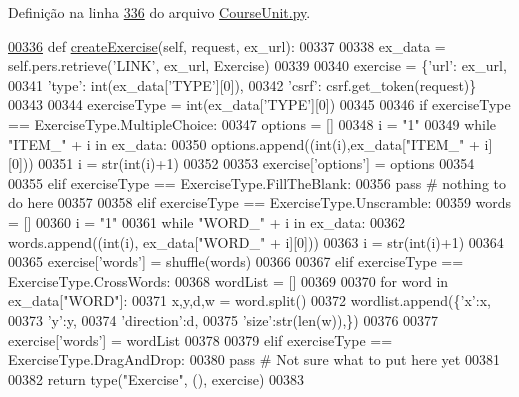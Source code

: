 Definição na linha \hyperlink{CourseUnit_8py_source_l00336}{336} do arquivo \hyperlink{CourseUnit_8py_source}{Course\+Unit.\+py}.


\begin{DoxyCode}
\hypertarget{classCourse_1_1CourseUnit_1_1BusCourse_l00336}{}\hyperlink{classCourse_1_1CourseUnit_1_1BusCourse_a4b9b8ec5eb949d3a1b42aee125b1b90b}{00336}     \textcolor{keyword}{def }\hyperlink{classCourse_1_1CourseUnit_1_1BusCourse_a4b9b8ec5eb949d3a1b42aee125b1b90b}{createExercise}(self, request, ex\_url):
00337 
00338         ex\_data = self.pers.retrieve(\textcolor{stringliteral}{'LINK'}, ex\_url, Exercise)
00339 
00340         exercise = \{\textcolor{stringliteral}{'url'}: ex\_url, 
00341                     \textcolor{stringliteral}{'type'}: int(ex\_data[\textcolor{stringliteral}{'TYPE'}][0]),
00342                     \textcolor{stringliteral}{'csrf'}: csrf.get\_token(request)\}
00343 
00344         exerciseType = int(ex\_data[\textcolor{stringliteral}{'TYPE'}][0])
00345 
00346         \textcolor{keywordflow}{if} exerciseType == ExerciseType.MultipleChoice:
00347             options = []
00348             i = \textcolor{stringliteral}{"1"}
00349             \textcolor{keywordflow}{while} \textcolor{stringliteral}{"ITEM\_"} + i \textcolor{keywordflow}{in} ex\_data:
00350                 options.append((int(i),ex\_data[\textcolor{stringliteral}{"ITEM\_"} + i][0]))
00351                 i = str(int(i)+1)
00352 
00353             exercise[\textcolor{stringliteral}{'options'}] = options
00354 
00355         \textcolor{keywordflow}{elif} exerciseType == ExerciseType.FillTheBlank:
00356             \textcolor{keywordflow}{pass} \textcolor{comment}{# nothing to do here}
00357 
00358         \textcolor{keywordflow}{elif} exerciseType == ExerciseType.Unscramble:
00359             words = []
00360             i = \textcolor{stringliteral}{"1"}
00361             \textcolor{keywordflow}{while} \textcolor{stringliteral}{"WORD\_"} + i \textcolor{keywordflow}{in} ex\_data:
00362                 words.append((int(i), ex\_data[\textcolor{stringliteral}{"WORD\_"} + i][0]))
00363                 i = str(int(i)+1)
00364 
00365             exercise[\textcolor{stringliteral}{'words'}] = shuffle(words)
00366 
00367         \textcolor{keywordflow}{elif} exerciseType == ExerciseType.CrossWords:
00368             wordList = []
00369             
00370             \textcolor{keywordflow}{for} word \textcolor{keywordflow}{in} ex\_data[\textcolor{stringliteral}{"WORD"}]:
00371                 x,y,d,w = word.split()
00372                 wordlist.append(\{\textcolor{stringliteral}{'x'}:x,
00373                                  \textcolor{stringliteral}{'y'}:y,
00374                                  \textcolor{stringliteral}{'direction'}:d,
00375                                  \textcolor{stringliteral}{'size'}:str(len(w)),\})
00376 
00377             exercise[\textcolor{stringliteral}{'words'}] = wordList
00378 
00379         \textcolor{keywordflow}{elif} exerciseType == ExerciseType.DragAndDrop:
00380             \textcolor{keywordflow}{pass} \textcolor{comment}{# Not sure what to put here yet}
00381 
00382         \textcolor{keywordflow}{return} type(\textcolor{stringliteral}{"Exercise"}, (), exercise)
00383 
\end{DoxyCode}
